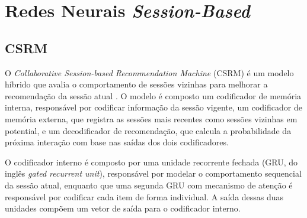 



\section{Redes Neurais \textit{Session-Based}}
\subsection{CSRM}
O \textit{Collaborative Session-based Recommendation Machine} (CSRM) é um modelo
híbrido que avalia o comportamento de sessões vizinhas para melhorar a
recomendação da sessão atual \cite{collaborative2018}. O modelo é composto um
codificador de memória interna, responsável por codificar informação da sessão
vigente, um codificador de memória externa, que registra as sessões mais
recentes como sessões vizinhas em potential, e um decodificador de recomendação,
que calcula a probabilidade da próxima interação com base nas saídas dos dois
codificadores.

O codificador interno é composto por uma unidade recorrente fechada (GRU, do
inglês \textit{gated recurrent unit}), responsável por modelar
o comportamento sequencial da sessão atual, enquanto que uma segunda GRU com
mecanismo de atenção é responsável por codificar cada item de forma individual.
A saída dessas duas unidades compõem um vetor de saída para o codificador interno.

